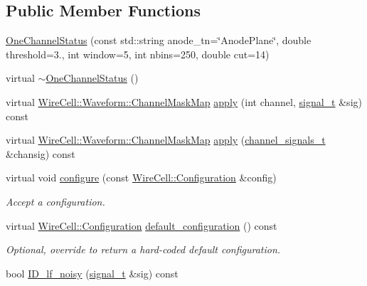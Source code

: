 \subsection*{Public Member Functions}
\begin{DoxyCompactItemize}
\item 
\hyperlink{class_wire_cell_1_1_sig_proc_1_1_microboone_1_1_one_channel_status_a9f2dbcbbeacb6d1a14b0be15681040bc}{One\+Channel\+Status} (const std\+::string anode\+\_\+tn=\char`\"{}Anode\+Plane\char`\"{}, double threshold=3., int window=5, int nbins=250, double cut=14)
\item 
virtual \hyperlink{class_wire_cell_1_1_sig_proc_1_1_microboone_1_1_one_channel_status_ab71cb91131cf0981713a00161ce1725e}{$\sim$\+One\+Channel\+Status} ()
\item 
virtual \hyperlink{namespace_wire_cell_1_1_waveform_a18b9ae61c858e340252ba3ac83ac3bc0}{Wire\+Cell\+::\+Waveform\+::\+Channel\+Mask\+Map} \hyperlink{class_wire_cell_1_1_sig_proc_1_1_microboone_1_1_one_channel_status_af75669068bb7e6b9e618c887025c9fa3}{apply} (int channel, \hyperlink{class_wire_cell_1_1_i_channel_filter_a434ed96cc4b805fa0eeec14f9f8d85e9}{signal\+\_\+t} \&sig) const
\item 
virtual \hyperlink{namespace_wire_cell_1_1_waveform_a18b9ae61c858e340252ba3ac83ac3bc0}{Wire\+Cell\+::\+Waveform\+::\+Channel\+Mask\+Map} \hyperlink{class_wire_cell_1_1_sig_proc_1_1_microboone_1_1_one_channel_status_a4719e79f3e553512387a4de632451818}{apply} (\hyperlink{class_wire_cell_1_1_i_channel_filter_a44de35ce47701d84cd45393c6bcd5e2f}{channel\+\_\+signals\+\_\+t} \&chansig) const
\item 
virtual void \hyperlink{class_wire_cell_1_1_sig_proc_1_1_microboone_1_1_one_channel_status_ab1ff00e5fcfd1665621ef0a81b30f463}{configure} (const \hyperlink{namespace_wire_cell_a9f705541fc1d46c608b3d32c182333ee}{Wire\+Cell\+::\+Configuration} \&config)
\begin{DoxyCompactList}\small\item\em Accept a configuration. \end{DoxyCompactList}\item 
virtual \hyperlink{namespace_wire_cell_a9f705541fc1d46c608b3d32c182333ee}{Wire\+Cell\+::\+Configuration} \hyperlink{class_wire_cell_1_1_sig_proc_1_1_microboone_1_1_one_channel_status_a49fa11b8a1e5d6a952c9c797070d69cc}{default\+\_\+configuration} () const
\begin{DoxyCompactList}\small\item\em Optional, override to return a hard-\/coded default configuration. \end{DoxyCompactList}\item 
bool \hyperlink{class_wire_cell_1_1_sig_proc_1_1_microboone_1_1_one_channel_status_a3836d07fe79d2efedd72838ac4e13d92}{I\+D\+\_\+lf\+\_\+noisy} (\hyperlink{class_wire_cell_1_1_i_channel_filter_a434ed96cc4b805fa0eeec14f9f8d85e9}{signal\+\_\+t} \&sig) const
\end{DoxyCompactItemize}
